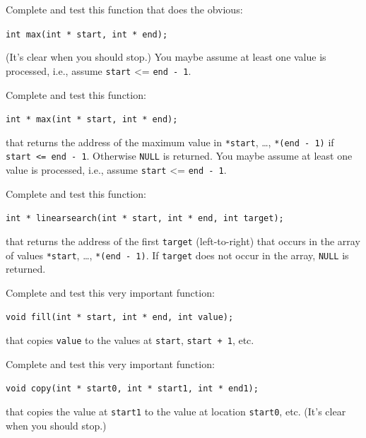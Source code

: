 \begin{ex}
Complete and test this function that does the
obvious:

\verb!int max(int * start, int * end);!

(It's clear when you should stop.) You maybe assume at least one value
is processed, i.e., assume \texttt{start} <= \texttt{end - 1}.
\end{ex}

\begin{ex}
Complete and test this function:

\verb!int * max(int * start, int * end);!

that returns the address of the maximum value in \texttt{*start}, \ldots,
\texttt{*(end - 1)} if \texttt{start <= end - 1}. Otherwise
\texttt{NULL} is returned. You maybe assume at least one value is
processed, i.e., assume \texttt{start} <= \texttt{end - 1}.
\end{ex}

\begin{ex}
Complete and test this function:

\verb!int * linearsearch(int * start, int * end, int target);!

that returns the address of the first \texttt{target} (left-to-right) that
occurs in the array of values \texttt{*start}, \ldots, \texttt{*(end - 1)}.
If \texttt{target} does not occur in the array, \texttt{NULL} is returned.
\end{ex}

\begin{ex}
Complete and test this very important function:

\verb!void fill(int * start, int * end, int value);!

that copies \texttt{value} to the values at \texttt{start}, \texttt{start +
1}, etc.
\end{ex}

\begin{ex}
Complete and test this very important function:

\verb!void copy(int * start0, int * start1, int * end1);!

that copies the value at \texttt{start1} to the value at location
\texttt{start0}, etc. (It's clear when you should stop.)
\end{ex}

